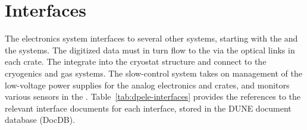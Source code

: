 \section{Interfaces}
\label{sec:fddp-tpc-elec-intfc}


The \dual electronics system interfaces to several other systems, starting with the  and the  systems.  The digitized data must in turn %
flow to the  via the optical links in each  crate. The  integrate into the cryostat structure and connect to the cryogenics and gas systems. The slow-control system takes on management of the low-voltage power supplies for the  analog electronics and  crates, and  monitors various sensors in the . %
Table~\ref{tab:dpele-interfaces} provides the references to the relevant interface documents for each interface, stored in the DUNE document database (DocDB).

